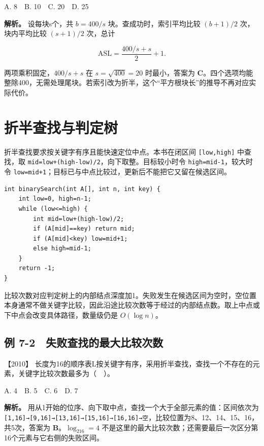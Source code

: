 A. 8　B. 10　C. 20　D. 25


\textbf{解析。} 设每块s个，共 \(b=400/s\) 块。查成功时，索引平均比较 \((b+1)/2\) 次，块内平均比较 \((s+1)/2\) 次，总计

\[\mathrm{ASL}=\frac{400/s+s}{2}+1.\]

两项乘积固定，\(400/s+s\) 在 \(s=\sqrt{400}=20\) 时最小，答案为 \textbf{C}。四个选项均能整除400，无需处理尾块。若索引改为折半，这个``平方根块长''的推导不再对应实际代价。

\section{折半查找与判定树}\label{ds-07-03}

折半查找要求按关键字有序且能快速定位中点。本书在闭区间 \texttt{{[}low,}\allowbreak{}\texttt{high{]}} 中查找，取 \texttt{mid=low+(high-low)/2}，向下取整。目标较小时令 \texttt{high=mid-1}，较大时令 \texttt{low=mid+1}；目标已与中点比较过，更新后不能把它又留在候选区间。

\par\medskip\noindent
\begin{minipage}{\linewidth}
\begin{verbatim}
int binarySearch(int A[], int n, int key) {
    int low=0, high=n-1;
    while (low<=high) {
        int mid=low+(high-low)/2;
        if (A[mid]==key) return mid;
        if (A[mid]<key) low=mid+1;
        else high=mid-1;
    }
    return -1;
}
\end{verbatim}
\end{minipage}\par\medskip

比较次数对应判定树上的内部结点深度加1。失败发生在候选区间为空时，空位置本身通常不做关键字比较，因此沿途比较次数等于经过的内部结点数。取上中点或下中点会改变具体路径，数量级仍是 \(O(\log n)\)。

\subsection{例 7-2　失败查找的最大比较次数}\label{ds-ex7-2}

\noindent{}【2010】 长度为16的顺序表L按关键字有序，采用折半查找，查找一个不存在的元素，关键字比较次数最多为（　）。

A. 4　B. 5　C. 6　D. 7


\textbf{解析。} 用从1开始的位序、向下取中点，查找一个大于全部元素的值：区间依次为 \texttt{{[}1,}\allowbreak{}\texttt{16{]}→{[}9,}\allowbreak{}\texttt{16{]}→{[}13,}\allowbreak{}\texttt{16{]}→{[}15,}\allowbreak{}\texttt{16{]}→{[}16,}\allowbreak{}\texttt{16{]}→空}，比较位置为8、12、14、15、16，共5次，答案为 \textbf{B}。\(\log_216=4\) 不是这里的最大比较次数；还需要最后一次区分第16个元素与它右侧的失败区间。

